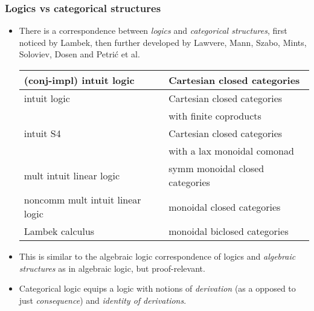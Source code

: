 \documentclass[10pt,t]{beamer}
\begin{document}
\begin{frame}

\frametitle{Logics vs categorical structures}

\begin{itemize}

\item There is a correspondence between \emph{logics} and
  \emph{categorical structures}, first noticed by Lambek, then further
  developed by Lawvere, Mann, Szabo, Mints, Soloviev, Dosen and
  Petri\'c et al.

\bigskip

\begin{center}
\scriptsize
\begin{tabular}{l|l}
(conj-impl) intuit logic & Cartesian closed categories \\ \hline
intuit logic & Cartesian closed categories \\ 
  & \quad with finite coproducts \\ \hline
intuit S4 & Cartesian closed categories \\ 
& \quad with a lax monoidal comonad \\ \hline
mult intuit linear logic & symm monoidal closed categories \\ \hline
noncomm mult intuit linear logic & monoidal closed categories \\ \hline
Lambek calculus & monoidal biclosed categories 
\end{tabular}
\end{center}

\bigskip

\item This is similar to the algebraic logic correspondence of logics
  and \emph{algebraic structures} as in algebraic logic, but
  proof-relevant.

\bigskip

\item Categorical logic equips a logic with notions of
  \emph{derivation} (as a opposed to just \emph{consequence}) and
  \emph{identity of derivations}.

\end{itemize}

\end{frame}
\end{document}
